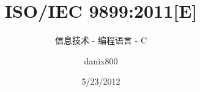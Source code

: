 \documentclass[cn,11pt,fancy,hide,normal]{elegantbook}
\title{ISO/IEC 9899:2011[E] }
\subtitle{信息技术 - 编程语言 - C}
\author{danix800}
\institute{ISO/IEC}
\date{5/23/2012}
\newcounter{excntr}
\newcounter{notescntr}
\newcommand{\chptr}[2]{
  \chapter{#1\label{#2}}
  \setcounter{excntr}{0}
  \setcounter{notescntr}{0}
}
\begin{document}
\maketitle
\tableofcontents


\mainmatter
\hypersetup{pageanchor=true}











\renewcommand{\thechapter}{\Alph{annexchptr}}
\renewcommand{\chaptername}{附录 \thechapter\;}
\renewcommand{\chptr}[2]{
  \stepcounter{annexchptr}
  \chapter{#1\label{#2}}
  \setcounter{excntr}{0}
  \setcounter{notescntr}{0}
}














\end{document}
